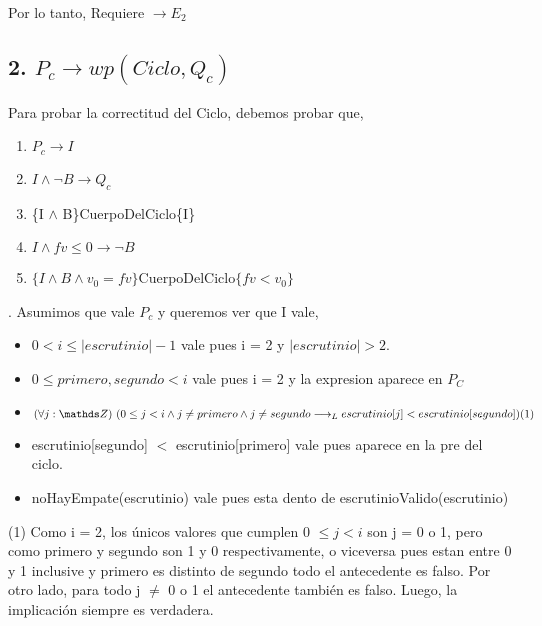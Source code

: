 \documentclass[10pt,a4paper]{article}
\begin{document}
\noindent Por lo tanto, Requiere $\rightarrow E_2$ \\

\newpage

\subsection{2. $P_c \rightarrow wp(Ciclo, Q_c)$ }

\vspace{0.1cm}

\noindent Para probar la correctitud del Ciclo, debemos probar que, 

\begin{enumerate}\setlength{\itemindent}{0.5cm}
	\item $P_c \rightarrow I$
	\item $I \land \neg B \rightarrow Q_c$
	\item \{I $\land$ B\}CuerpoDelCiclo\{I\}
	\item $I \land fv \leq 0 \rightarrow \neg B$
	\item $\{I \land B \land v_0 = fv\}$CuerpoDelCiclo$\{fv < v_0\}$ \\
\end{enumerate}

. Asumimos que vale $P_c$ y queremos ver que I vale,

\begin{itemize}\setlength{\itemindent}{0.5cm}
	\item  $0 < i \leq |escrutinio| - 1$ vale pues i = 2 y $|escrutinio| > 2.$
	\item $0 \leq primero, segundo < i  $ vale pues i = 2 y la expresion aparece en $P_C$
	\item  $\paraTodo[unalinea]{j}{\ent}{0 \leq j < i \land j \neq primero \land  j \neq segundo \implicaLuego  escrutinio[j] < escrutinio[segundo]}  (1)$
	\item escrutinio[segundo] $<$ escrutinio[primero] vale pues aparece en la pre del ciclo.
	\item noHayEmpate(escrutinio) vale pues esta dento de escrutinioValido(escrutinio)
\end{itemize}

\noindent (1) Como i = 2, los únicos  valores que cumplen 0 $\leq j < i$ son j = 0 o 1, pero como primero y segundo son 1 y 0 respectivamente, o viceversa pues estan entre 0 y 1 inclusive y primero es distinto de segundo todo el antecedente es falso.
Por otro lado, para todo j $\neq$ 0 o 1 el antecedente también es falso. Luego, la implicación siempre es verdadera. \\
\end{document}
